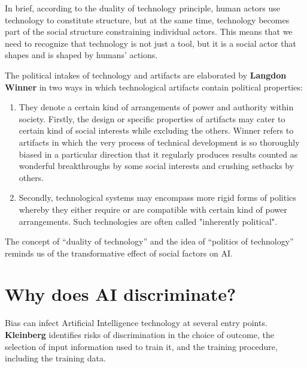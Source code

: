 In brief, according to the duality of technology principle, human actors use technology to constitute structure, but at the same time, technology becomes part of the social structure constraining individual actors. This means that we need to recognize that technology is not just a tool, but it is a social actor that shapes and is shaped by humans’ actions.

The political intakes of technology and artifacts are elaborated by \textbf{Langdon Winner} in two ways in which technological artifacts contain political properties:
\begin{enumerate}
    \item They denote a certain kind of arrangements of power and authority within society. Firstly, the design or specific properties of artifacts may cater to certain kind of social interests while excluding the others. Winner refers to artifacts in which the very process of technical development is so thoroughly biased in a particular direction that it regularly produces results counted as wonderful breakthroughs by some social interests and crushing setbacks by others.
    \item Secondly, technological systems may encompass more rigid forms of politics whereby they either require or are compatible with certain kind of power arrangements. Such technologies are often called "inherently political".
\end{enumerate}

The concept of “duality of technology” and the idea of “politics of technology” reminds us of the transformative effect of social factors on AI.

\section{Why does AI discriminate?}
Bias can infect Artificial Intelligence technology at several entry points. \textbf{Kleinberg} identifies risks of discrimination in the choice of outcome, the selection of input information used to train it, and the training procedure, including the training data.

